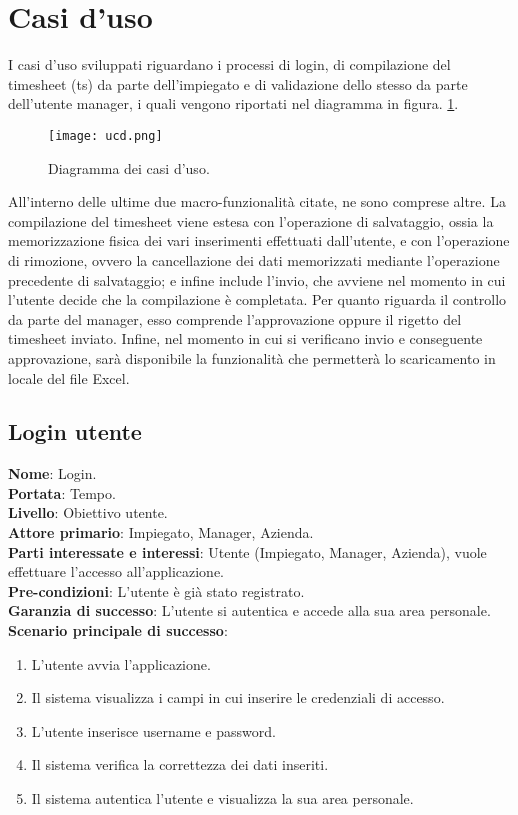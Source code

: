 \section{Casi d'uso}
I casi d'uso sviluppati riguardano i processi di login, di compilazione del timesheet (ts) da parte dell'impiegato e di validazione dello stesso da parte dell'utente manager, i quali vengono riportati nel diagramma in figura. \ref{fig:usecase}. 

\begin{figure}[H]
	\centering
	\texttt{[image: ucd.png]}
	\caption{Diagramma dei casi d'uso.}
	\label{fig:usecase}
\end{figure}

All'interno delle ultime due macro-funzionalità citate, ne sono comprese altre. La compilazione del timesheet viene estesa con l'operazione di salvataggio, ossia la memorizzazione fisica dei vari inserimenti effettuati dall'utente, e con l'operazione di rimozione, ovvero la cancellazione dei dati memorizzati mediante l'operazione precedente di salvataggio; e infine include l'invio, che avviene nel momento in cui l'utente decide che la compilazione è completata. Per quanto riguarda il controllo da parte del manager, esso comprende l'approvazione oppure il rigetto del timesheet inviato. Infine, nel momento in cui si verificano invio e conseguente approvazione, sarà disponibile la funzionalità che permetterà lo scaricamento in locale del file Excel.

\subsection{Login utente}
\textbf{Nome}: Login.\\
\textbf{Portata}: Tempo.\\
\textbf{Livello}: Obiettivo utente.\\
\textbf{Attore primario}: Impiegato, Manager, Azienda.\\
\textbf{Parti interessate e interessi}: Utente (Impiegato, Manager, Azienda), vuole effettuare l'accesso all'applicazione.\\
\textbf{Pre-condizioni}: L'utente è già stato registrato.\\
\textbf{Garanzia di successo}: L'utente si autentica e accede alla sua area personale.\\
\textbf{Scenario principale di successo}:
\begin{enumerate}
    \item L'utente avvia l'applicazione.
    \item Il sistema visualizza i campi in cui inserire le credenziali di accesso.
    \item L'utente inserisce username e password.
    \item Il sistema verifica la correttezza dei dati inseriti.
    \item Il sistema autentica l'utente e visualizza la sua area personale.
\end{enumerate}

